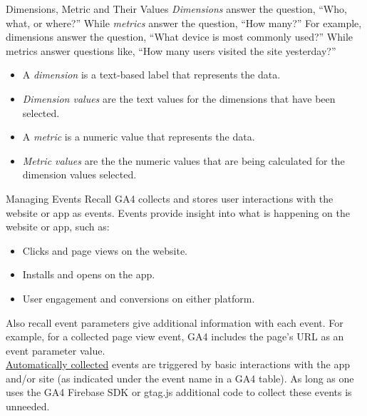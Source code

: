 \documentclass[pdf]{beamer}
\theoremstyle{remark}
\theoremstyle{definition}
\begin{document}
\begin{frame}[t]{Dimensions, Metric and Their Values}
\textit{Dimensions} answer the question, ``Who, what, or where?'' While \textit{metrics} answer the question, ``How many?'' For example, dimensions answer the question, ``What device is most commonly used?'' While metrics answer questions like, ``How many users visited the site yesterday?'' \\
\small
\begin{itemize}
\item A \textit{dimension} is a text-based label that represents the data.
\item \textit {Dimension values} are the text values for the dimensions that have been selected. 
\item A \textit{metric} is a numeric value that represents the data.
\item \textit{Metric values} are the the numeric values that are being calculated for the dimension values selected.
\end{itemize}
\end{frame}

\begin{frame}[t]{Managing Events}
Recall GA4 collects and stores user interactions with the website or app as events. Events provide insight into what is happening on the website or app, such as: \\
\small
\begin{itemize}
  \item Clicks and page views on the website.
  \item Installs and opens on the app.
  \item User engagement and conversions on either platform.
\end{itemize}
\normalsize 
Also recall event parameters give additional information with each event.  For example, for a collected page view event, GA4 includes the page's URL as an event parameter value. \\
\vspace{1.5ex}
\underline{Automatically collected} events are triggered by basic interactions with the app and/or site (as indicated under the event name in a GA4 table). As long as one uses the GA4 Firebase SDK or gtag.js additional code to collect these events is unneeded.
\end{frame}
\end{document}

